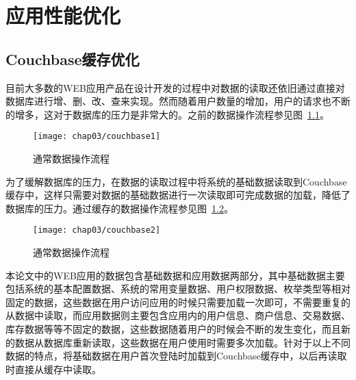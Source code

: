 \chapter{应用性能优化}
\label{cha:ApplicationOptimization}
\section{Couchbase缓存优化}
目前大多数的WEB应用产品在设计开发的过程中对数据的读取还依旧通过直接对数据库进行增、删、改、查来实现。然而随着用户数量的增加，用户的请求也不断的增多，这对于数据库的压力是非常大的。之前的数据操作流程参见图~\ref{fig:couchbase1}。
\begin{figure}[H] %
  \centering
  \texttt{[image: chap03/couchbase1]}
  \caption{通常数据操作流程}
  \label{fig:couchbase1}
\end{figure}
为了缓解数据库的压力，在数据的读取过程中将系统的基础数据读取到Couchbase缓存中，这样只需要对数据的基础数据进行一次读取即可完成数据的加载，降低了数据库的压力。通过缓存的数据操作流程参见图~\ref{fig:couchbase2}。
\begin{figure}[H] %
  \centering
  \texttt{[image: chap03/couchbase2]}
  \caption{通常数据操作流程}
  \label{fig:couchbase2}
\end{figure}
本论文中的WEB应用的数据包含基础数据和应用数据两部分，其中基础数据主要包括系统的基本配置数据、系统的常用变量数据、用户权限数据、枚举类型等相对固定的数据，这些数据在用户访问应用的时候只需要加载一次即可，不需要重复的从数据中读取，而应用数据则主要包含应用内的用户信息、商户信息、交易数据、库存数据等等不固定的数据，这些数据随着用户的时候会不断的发生变化，而且新的数据从数据库重新读取，这些数据在用户使用时需要多次加载。针对于以上不同数据的特点，将基础数据在用户首次登陆时加载到Couchbase缓存中，以后再读取时直接从缓存中读取。


